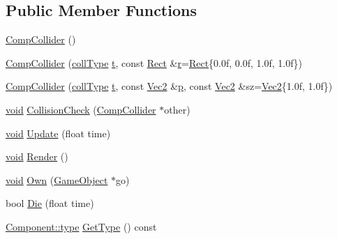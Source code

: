 \subsection*{Public Member Functions}
\begin{DoxyCompactItemize}
\item 
\hyperlink{class_comp_collider_a706ce7c898fcc058e326d924a9615e68}{Comp\-Collider} ()
\item 
\hyperlink{class_comp_collider_a59bb2f58d47c489ddd7213dc4c446bf0}{Comp\-Collider} (\hyperlink{class_comp_collider_a9eea092846b889fb5652416832727acd}{coll\-Type} \hyperlink{_s_d_l__opengl_8h_a7d65d00ca3b0630d9b5c52df855b19f5}{t}, const \hyperlink{class_rect}{Rect} \&\hyperlink{_s_d_l__opengl_8h_a42ce7cdc612e53abee15043f80220d97}{r}=\hyperlink{class_rect}{Rect}\{0.\-0f, 0.\-0f, 1.\-0f, 1.\-0f\})
\item 
\hyperlink{class_comp_collider_a1e2e16a7f596eac2110e02e61e62538f}{Comp\-Collider} (\hyperlink{class_comp_collider_a9eea092846b889fb5652416832727acd}{coll\-Type} \hyperlink{_s_d_l__opengl_8h_a7d65d00ca3b0630d9b5c52df855b19f5}{t}, const \hyperlink{class_vec2}{Vec2} \&\hyperlink{_s_d_l__opengl__glext_8h_aa5367c14d90f462230c2611b81b41d23}{p}, const \hyperlink{class_vec2}{Vec2} \&sz=\hyperlink{class_vec2}{Vec2}\{1.\-0f, 1.\-0f\})
\item 
\hyperlink{_s_d_l__opengles2__gl2ext_8h_ae5d8fa23ad07c48bb609509eae494c95}{void} \hyperlink{class_comp_collider_af0542c5b6e3cf98f5c3ec6fd97366c4b}{Collision\-Check} (\hyperlink{class_comp_collider}{Comp\-Collider} $\ast$other)
\item 
\hyperlink{_s_d_l__opengles2__gl2ext_8h_ae5d8fa23ad07c48bb609509eae494c95}{void} \hyperlink{class_comp_collider_ae2883ed5f225e3f496f77bcf5c6f9286}{Update} (float time)
\item 
\hyperlink{_s_d_l__opengles2__gl2ext_8h_ae5d8fa23ad07c48bb609509eae494c95}{void} \hyperlink{class_comp_collider_a0797d855ac72f90c7385764785bd5862}{Render} ()
\item 
\hyperlink{_s_d_l__opengles2__gl2ext_8h_ae5d8fa23ad07c48bb609509eae494c95}{void} \hyperlink{class_comp_collider_a0e23be031b8aef7f2d21d05bc254bbb5}{Own} (\hyperlink{class_game_object}{Game\-Object} $\ast$go)
\item 
bool \hyperlink{class_comp_collider_a9957bf13784983bcf1c985208acfc110}{Die} (float time)
\item 
\hyperlink{class_component_ad6d161b6acf7b843b55bb9feac7af71a}{Component\-::type} \hyperlink{class_comp_collider_a90ff44d718410925072cfcb3d934f196}{Get\-Type} () const 
\end{DoxyCompactItemize}
